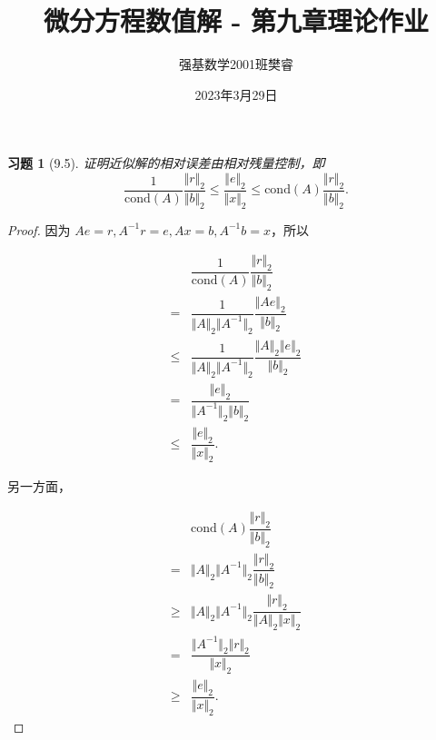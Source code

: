 \documentclass{ctexart}
\title{微分方程数值解 - 第九章理论作业}
\author{强基数学2001班樊睿}
\date{2023年3月29日}
\newtheorem{ex}{习题}
\begin{document}
\maketitle

\begin{ex}[9.5]
    证明近似解的相对误差由相对残量控制，即
    \begin{equation}
        \dfrac 1{\mathrm{cond}(A)} \dfrac {\Vert r\Vert_2}{\Vert b\Vert_2} \leq \dfrac {\Vert e\Vert_2}{\Vert x\Vert_2}\leq \mathrm{cond}(A) \dfrac {\Vert r\Vert_2}{\Vert b\Vert_2}.
    \end{equation}
\end{ex}

\begin{proof}
    因为 $Ae=r,A^{-1}r=e,Ax=b,A^{-1}b=x$，所以

    \begin{equation}
    \begin{split}
        & \dfrac 1{\mathrm{cond}(A)} \dfrac {\Vert r\Vert_2}{\Vert b\Vert_2} \\
        = & \dfrac 1{\Vert A\Vert_2\Vert A^{-1}\Vert_2}\dfrac {\Vert Ae\Vert_2}{\Vert b\Vert_2} \\
        \leq & \dfrac 1{\Vert A\Vert_2\Vert A^{-1}\Vert_2}\dfrac {\Vert A\Vert_2\Vert e\Vert_2}{\Vert b\Vert_2} \\
        = & \dfrac {\Vert e\Vert_2}{\Vert A^{-1}\Vert_2\Vert b \Vert_2}\\
        \leq & \dfrac {\Vert e\Vert_2}{\Vert x\Vert_2}.
    \end{split}
    \end{equation}

    另一方面，

    \begin{equation*}
    \begin{split}
        & \mathrm{cond}(A) \dfrac {\Vert r\Vert_2}{\Vert b\Vert_2} \\
        = & \Vert A\Vert_2\Vert A^{-1}\Vert_2\dfrac {\Vert r\Vert_2}{\Vert b\Vert_2} \\
        \geq & \Vert A\Vert_2\Vert A^{-1}\Vert_2\dfrac {\Vert r\Vert_2}{\Vert A\Vert_2\Vert x\Vert_2} \\
        = & \dfrac{\Vert A^{-1}\Vert_2\Vert r\Vert_2}{\Vert x\Vert_2} \\
        \geq & \dfrac {\Vert e\Vert_2}{\Vert x\Vert_2}.
    \end{split}
    \end{equation*}
\end{proof}
\end{document}
